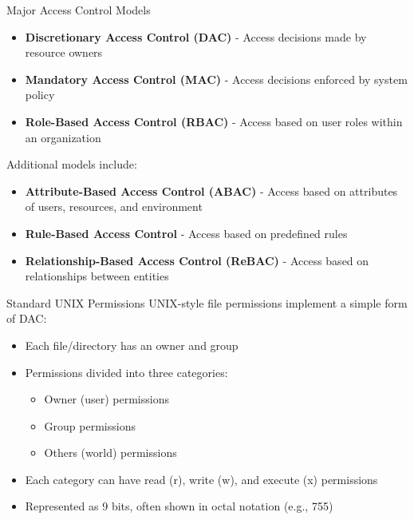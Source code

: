 \multend



\begin{concept}{Major Access Control Models}

\begin{itemize}
    \item \textbf{Discretionary Access Control (DAC)} - Access decisions made by resource owners
    \item \textbf{Mandatory Access Control (MAC)} - Access decisions enforced by system policy
    \item \textbf{Role-Based Access Control (RBAC)} - Access based on user roles within an organization
\end{itemize}
Additional models include:
\begin{itemize}
    \item \textbf{Attribute-Based Access Control (ABAC)} - Access based on attributes of users, resources, and environment
    \item \textbf{Rule-Based Access Control} - Access based on predefined rules
    \item \textbf{Relationship-Based Access Control (ReBAC)} - Access based on relationships between entities
\end{itemize}
\end{concept}

\begin{definition}{Standard UNIX Permissions}
UNIX-style file permissions implement a simple form of DAC:
\begin{itemize}
    \item Each file/directory has an owner and group
    \item Permissions divided into three categories:
    \begin{itemize}
        \item Owner (user) permissions
        \item Group permissions
        \item Others (world) permissions
    \end{itemize}
    \item Each category can have read (r), write (w), and execute (x) permissions
    \item Represented as 9 bits, often shown in octal notation (e.g., 755)
\end{itemize}
\end{definition}



